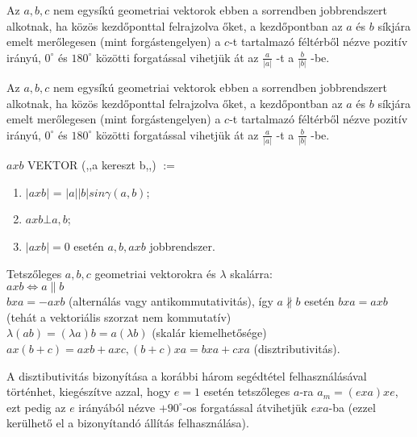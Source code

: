 	\begin{frame}
		\begin{tcolorbox}[title={Def.: Skaláris szorzat, geometriai vektorokra}]
			Az $a, b, c$ nem egysíkú geometriai vektorok ebben a sorrendben jobbrendszert alkotnak, ha közös kezdőponttal felrajzolva őket, a kezdőpontban az $a$ és $b$ síkjára emelt merőlegesen (mint forgástengelyen) a $c$-t tartalmazó féltérből nézve pozitív irányú, $0^{\circ}$ és $180^{\circ}$ közötti forgatással vihetjük át az $\frac{a}{|a|}$ -t a $\frac{b}{|b|}$ -be.
		\end{tcolorbox}	
		
		\begin{tcolorbox}[title={Def.: Jobbrendszer}]
			Az $a, b, c$ nem egysíkú geometriai vektorok ebben a sorrendben jobbrendszert alkotnak, ha közös kezdőponttal felrajzolva őket, a kezdőpontban az $a$ és $b$ síkjára emelt merőlegesen (mint forgástengelyen) a $c$-t tartalmazó féltérből nézve pozitív irányú, $0^{\circ}$ és $180^{\circ}$ közötti forgatással vihetjük át az $\frac{a}{|a|}$ -t a $\frac{b}{|b|}$ -be.
		\end{tcolorbox}	
		
		\begin{tcolorbox}[title={Def.: Vektoriális szorzat}]
			$a x b$ VEKTOR (,,a kereszt b,,) $:=$\\
			\mmedskip
			
			\begin{enumerate}
			\item $|a x b|$ = $|a||b| sin {\gamma}(a, b)$;
			\item $a x b \bot a, b$;
			\item $|a x b| = 0$ esetén $a, b, a x b$ jobbrendszer.
			\end{enumerate}
		\end{tcolorbox}	
		
		\begin{tcolorbox}[title={Def.: Vektoriális szorzat műveleti tulajdonságai}]
				Tetszőleges $a, b, c$ geometriai vektorokra és ${\lambda}$ skalárra: \\
				
				$a x b \iff a \parallel b$\\
				$b x a = -a x b$ (alternálás vagy antikommutativitás), így $a \nparallel b$ esetén $b x  a = a x b$ (tehát a vektoriális szorzat nem kommutatív)\\
				${\lambda}(a b) = ({\lambda}a) b = a ({\lambda}b)$ (skalár kiemelhetősége)\\
				$a x (b + c) = a x b + a x c, (b + c) x a = b x a + c x a$ (disztributivitás).\\
				\mmedskip

				A disztibutivitás bizonyítása a korábbi három segédtétel felhasználásával történhet, kiegészítve azzal, hogy $e = 1$ esetén tetszőleges $a$-ra $a_m = (e x a) x e$, ezt pedig az $e$ irányából nézve $+90^{\circ}$-os forgatással átvihetjük $e x a$-ba (ezzel kerülhető el a bizonyítandó állítás felhasználása).

		\end{tcolorbox}	
	\end{frame}
	

